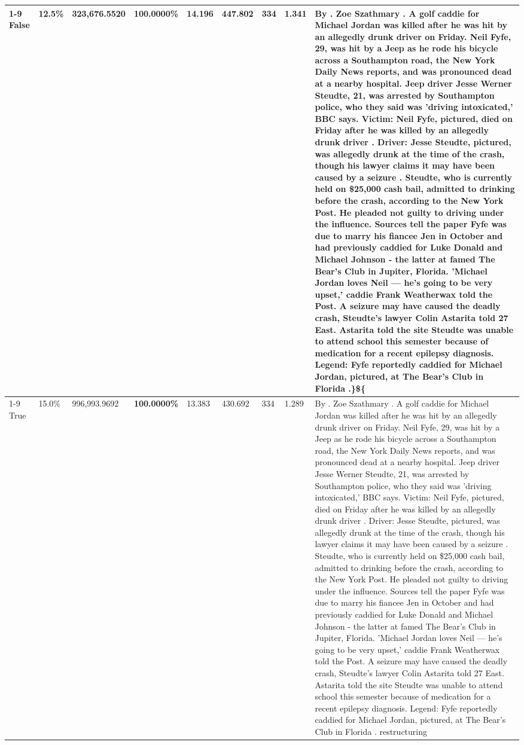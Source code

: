\begin{table}[H]
\begin{tabular}{lllrlllll}
\cline{1-9}
False & 12.5\% & 323,676.5520 & \bfseries \color{red} 100.0000\% & 14.196 & 447.802 & 334 & 1.341 & By . Zoe Szathmary . A golf caddie for Michael Jordan was killed after he was hit by an allegedly drunk driver on Friday. Neil Fyfe, 29, was hit by a Jeep as he rode his bicycle across a Southampton road, the New York Daily News reports, and was pronounced dead at a nearby hospital. Jeep driver Jesse Werner Steudte, 21, was arrested by Southampton police, who they said was 'driving intoxicated,' BBC says. Victim: Neil Fyfe, pictured, died on Friday after he was killed by an allegedly drunk driver . Driver: Jesse Steudte, pictured, was allegedly drunk at the time of the crash, though his lawyer claims it may have been caused by a seizure . Steudte, who is currently held on \$25,000 cash bail, admitted to drinking before the crash, according to the New York Post. He pleaded not guilty to driving under the influence. Sources tell the paper Fyfe was due to marry his fiancee Jen in October and had previously caddied for Luke Donald and Michael Johnson - the latter at famed The Bear's Club in Jupiter, Florida. 'Michael Jordan loves Neil — he’s going to be very upset,' caddie Frank Weatherwax told the Post. A seizure may have caused the deadly crash, Steudte's lawyer Colin Astarita told 27 East. Astarita told the site Steudte was unable to attend school this semester because of medication for a recent epilepsy diagnosis. Legend: Fyfe reportedly caddied for Michael Jordan, pictured, at The Bear's Club in Florida .\}\$\{ \\
\cline{1-9}
True & 15.0\% & 996,993.9692 & \bfseries \color{red} 100.0000\% & 13.383 & 430.692 & 334 & 1.289 & By . Zoe Szathmary . A golf caddie for Michael Jordan was killed after he was hit by an allegedly drunk driver on Friday. Neil Fyfe, 29, was hit by a Jeep as he rode his bicycle across a Southampton road, the New York Daily News reports, and was pronounced dead at a nearby hospital. Jeep driver Jesse Werner Steudte, 21, was arrested by Southampton police, who they said was 'driving intoxicated,' BBC says. Victim: Neil Fyfe, pictured, died on Friday after he was killed by an allegedly drunk driver . Driver: Jesse Steudte, pictured, was allegedly drunk at the time of the crash, though his lawyer claims it may have been caused by a seizure . Steudte, who is currently held on \$25,000 cash bail, admitted to drinking before the crash, according to the New York Post. He pleaded not guilty to driving under the influence. Sources tell the paper Fyfe was due to marry his fiancee Jen in October and had previously caddied for Luke Donald and Michael Johnson - the latter at famed The Bear's Club in Jupiter, Florida. 'Michael Jordan loves Neil — he’s going to be very upset,' caddie Frank Weatherwax told the Post. A seizure may have caused the deadly crash, Steudte's lawyer Colin Astarita told 27 East. Astarita told the site Steudte was unable to attend school this semester because of medication for a recent epilepsy diagnosis. Legend: Fyfe reportedly caddied for Michael Jordan, pictured, at The Bear's Club in Florida . restructuring \\

\end{tabular}
\end{table}
